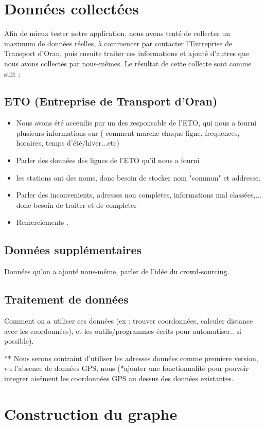\section{Données collectées}
Afin de mieux tester notre application, nous avons tenté de collecter un maximum de données réelles, à commencer par contacter l'Entreprise de Transport d'Oran, puis ensuite traiter ces informations et ajouté d'autres que nous avons collectés par nous-mêmes.
Le résultat de cette collecte sont comme suit :

\subsection{ETO (Entreprise de Transport d'Oran)}
\begin{itemize}
	\item Nous avons été acceuilis par un des responsable de l'ETO, qui nous a fourni plusieurs informations sur ( comment marche chaque ligne, frequences, horaires, temps d'été/hiver...etc)
	\item Parler des données des lignes de l'ETO qu'il nous a fourni
	\item les stations ont des noms, donc besoin de stocker nom "commun" et addresse.
	\item Parler des inconvenients, adresses non completes, informations mal classées,... donc besoin de traiter et de completer
	\item Remerciements .
\end{itemize}

\subsection{Données supplémentaires}
Données qu'on a ajouté nous-même, parler de l'idée du crowd-sourcing.

\subsection{Traitement de données}
Comment on a utiliser ces données (ex : trouver coordonnées, calculer distance avec les coordonnées), et les outils/programmes écrits pour automatiser.. si possible).
	
** Nous serons contraint d'utiliser les adresses données comme premiere version, vu l'absence de données GPS, nous (*ajouter une fonctionnalité pour pouvoir integrer aisément les coordonnées GPS au dessus des données existantes.

\section{Construction du graphe}
